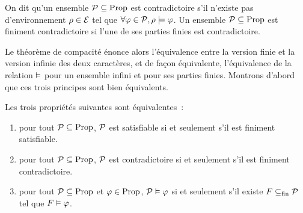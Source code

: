 \begin{definition}[Contradiction]
  On dit qu'un ensemble $\mathcal P\subseteq\operatorname{Prop}$ est contradictoire s'il
  n'existe pas d'environnement $\rho\in\mathcal E$ tel que
  $\forall \varphi \in\mathcal P, \rho\models \varphi$. Un ensemble
  $\mathcal P\subseteq \operatorname{Prop}$ est finiment contradictoire si l'une de ses
  parties finies est contradictoire.
\end{definition}

Le théorème de compacité énonce alors l'équivalence entre la version finie et la
version infinie des deux caractères, et de façon équivalente, l'équivalence de
la relation $\vDash$ pour un ensemble infini et pour ses parties finies.
Montrons d'abord que ces trois principes sont bien équivalents.

\begin{proposition}
  Les trois propriétés suivantes sont équivalentes~:
  \begin{enumerate}[label=(\roman*)]
  \item\label{enum.compac.prop1} pour tout $\mathcal P\subseteq \operatorname{Prop}$,
    $\mathcal P$ est satisfiable si et seulement s'il est finiment satisfiable.
  \item\label{enum.compac.prop2} pour tout $\mathcal P\subseteq\operatorname{Prop}$,
    $\mathcal P$ est contradictoire si et seulement s'il est finiment
    contradictoire.
  \item\label{enum.compac.prop3} pour tout $\mathcal P\subseteq\operatorname{Prop}$ et
    $\varphi\in\operatorname{Prop}$, $\mathcal P\vDash \varphi$ si et seulement s'il existe
    $F\subseteq_{\mathrm{fin}} \mathcal P$ tel que $F\vDash \varphi$.
  \end{enumerate}
\end{proposition}

